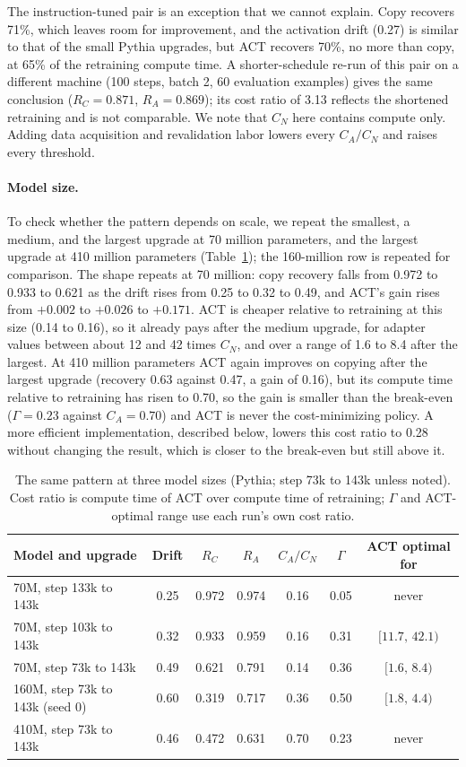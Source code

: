 \documentclass[acmsmall,review]{acmart}
\begin{document}
The instruction-tuned pair is an exception that we cannot explain. Copy recovers 71\%, which leaves room for improvement, and the activation drift (0.27) is similar to that of the small Pythia upgrades, but ACT recovers 70\%, no more than copy, at 65\% of the retraining compute time.
A shorter-schedule re-run of this pair on a different machine (100 steps, batch 2, 60 evaluation examples) gives the same conclusion ($R_C=0.871$, $R_A=0.869$); its cost ratio of 3.13 reflects the shortened retraining and is not comparable.
We note that $C_N$ here contains compute only. Adding data acquisition and revalidation labor lowers every $C_A/C_N$ and raises every threshold.

\paragraph{Model size.} To check whether the pattern depends on scale, we repeat the smallest, a medium, and the largest upgrade at 70 million parameters, and the largest upgrade at 410 million parameters (Table~\ref{tab:scale}); the 160-million row is repeated for comparison.
The shape repeats at 70 million: copy recovery falls from 0.972 to 0.933 to 0.621 as the drift rises from 0.25 to 0.32 to 0.49, and ACT's gain rises from $+0.002$ to $+0.026$ to $+0.171$. ACT is cheaper relative to retraining at this size (0.14 to 0.16), so it already pays after the medium upgrade, for adapter values between about 12 and 42 times $C_N$, and over a range of 1.6 to 8.4 after the largest.
At 410 million parameters ACT again improves on copying after the largest upgrade (recovery 0.63 against 0.47, a gain of 0.16), but its compute time relative to retraining has risen to 0.70, so the gain is smaller than the break-even ($\Gamma=0.23$ against $C_A=0.70$) and ACT is never the cost-minimizing policy. A more efficient implementation, described below, lowers this cost ratio to 0.28 without changing the result, which is closer to the break-even but still above it.

\begin{table}[t]
\centering
\caption{The same pattern at three model sizes (Pythia; step 73k to 143k unless noted). Cost ratio is compute time of ACT over compute time of retraining; $\Gamma$ and ACT-optimal range use each run's own cost ratio.}\label{tab:scale}
\begin{tabular}{lcccccc}
\toprule
Model and upgrade & Drift & $R_C$ & $R_A$ & $C_A/C_N$ & $\Gamma$ & ACT optimal for\\
\midrule
70M, step 133k to 143k & 0.25 & 0.972 & 0.974 & 0.16 & 0.05 & never\\
70M, step 103k to 143k & 0.32 & 0.933 & 0.959 & 0.16 & 0.31 & $[11.7,\,42.1)$\\
70M, step 73k to 143k & 0.49 & 0.621 & 0.791 & 0.14 & 0.36 & $[1.6,\,8.4)$\\
160M, step 73k to 143k (seed 0) & 0.60 & 0.319 & 0.717 & 0.36 & 0.50 & $[1.8,\,4.4)$\\
410M, step 73k to 143k & 0.46 & 0.472 & 0.631 & 0.70 & 0.23 & never\\
\bottomrule
\end{tabular}
\end{table}
\end{document}
